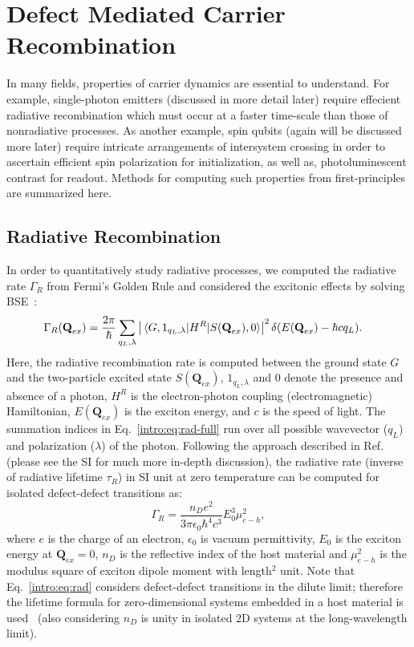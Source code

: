 \section{Defect Mediated Carrier Recombination}

In many fields, properties of carrier dynamics are essential to understand. For example, single-photon emitters (discussed in more detail later) require effecient radiative recombination which must occur at a faster time-scale than those of nonradiative processes. As another example, spin qubits (again will be discussed more later) require intricate arrangements of intersystem crossing in order to ascertain efficient spin polarization for initialization, as well as, photoluminescent contrast for readout. Methods for computing such properties from first-principles are summarized here.

\subsection{Radiative Recombination}
In order to quantitatively study radiative processes, we computed the radiative rate $\Gamma_R$ from Fermi's Golden Rule and considered the excitonic effects by solving BSE~\cite{wu2019dimensionality}:
\begin{align}
    \Gamma_R (\textbf{Q}_{ex}) &=
    \frac{2\pi}{\hbar}
    \sum_{q_L, \lambda}
    \left|
        \mel{G,1_{q_L,\lambda}}
        {H^R}
        {S(\textbf{Q}_{ex}),0}
    \right|^2
    \delta(E(\textbf{Q}_{ex}) -\hbar c q_L).
    \label{intro:eq:rad-full}
\end{align}
Here, the radiative recombination rate is computed between the ground state $G$ and the two-particle excited state $S(\textbf{Q}_{ex})$, $1_{q_L,\lambda}$ and 0 denote the presence and absence of a photon, $H^R$ is the electron-photon coupling (electromagnetic) Hamiltonian,  $E(\textbf{Q}_{ex})$ is the exciton energy, and $c$ is the speed of light.
The summation indices in Eq.~\ref{intro:eq:rad-full} run over all possible wavevector ($q_L$) and polarization ($\lambda$) of the photon.
Following the approach described in Ref.~\cite{wu2019dimensionality} (please see the SI for much more in-depth discussion), the radiative rate (inverse of radiative lifetime $\tau_R$) in SI unit at zero temperature can be computed for isolated defect-defect transitions as:
\begin{equation}
     \Gamma_R = \frac{n_D e^2}{3\pi\epsilon_0\hbar^4 c^3} E_0^3 \mu_{e-h}^2,
    \label{intro:eq:rad}
\end{equation}
where $e$ is the charge of an electron, $\epsilon_0$ is vacuum permittivity, $E_0$ is the exciton energy at $\textbf{Q}_{ex}=0$, $n_D$ is the reflective index of the host material and $\mu_{e-h}^2$ is the modulus square of exciton dipole moment with length$^2$ unit. Note that Eq.~\ref{intro:eq:rad} considers defect-defect transitions in the dilute limit; therefore the lifetime formula for zero-dimensional systems embedded in a host material is used~\cite{gupta2018two,mackoit2019carbon} (also considering $n_D$ is unity in isolated 2D systems at the long-wavelength limit).


